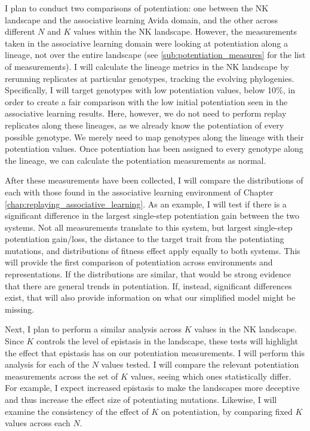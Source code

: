 I plan to conduct two comparisons of potentiation: one between the NK landscape and the associative learning Avida domain, and the other across different $N$ and $K$ values within the NK landscape. 
However, the measurements taken in the associative learning domain were looking at potentiation along a lineage, not over the entire landscape (see \ref{sub:potentiation_measures} for the list of measurements). 
I will calculate the lineage metrics in the NK landscape by rerunning replicates at particular genotypes, tracking the evolving phylogenies. 
Specifically, I will target genotypes with low potentiation values, below 10\%, in order to create a fair comparison with the low initial potentiation seen in the associative learning results. 
Here, however, we do not need to perform replay replicates along these lineages, as we already know the potentiation of every possible genotype.
We merely need to map genotypes along the lineage with their potentiation values. 
Once potentiation has been assigned to every genotype along the lineage, we can calculate the potentiation measurements as normal. 

After these measurements have been collected, I will compare the distributions of each with those found in the associative learning environment of Chapter \ref{chap:replaying_associative_learning}.
As an example, I will test if there is a significant difference in the largest single-step potentiation gain between the two systems. 
Not all measurements translate to this system, but largest single-step potentiation gain/loss, the distance to the target trait from the potentiating mutations, and distributions of fitness effect apply equally to both systems. 
This will provide the first comparison of potentiation across environments and representations. 
If the distributions are similar, that would be strong evidence that there are general trends in potentiation. 
If, instead, significant differences exist, that will also provide information on what our simplified model might be missing. 

Next, I plan to perform a similar analysis across $K$ values in the NK landscape. 
Since $K$ controls the level of epistasis in the landscape, these tests will highlight the effect that epistasis has on our potentiation measurements. 
I will perform this analysis for each of the $N$ values tested. 
I will compare the relevant potentiation measurements across the set of $K$ values, seeing which ones statistically differ. 
For example, I expect increased epistasis to make the landscapes more deceptive and thus increase the effect size of potentiating mutations.
Likewise, I will examine the consistency of the effect of $K$ on potentiation, by comparing fixed $K$ values across each $N$.

